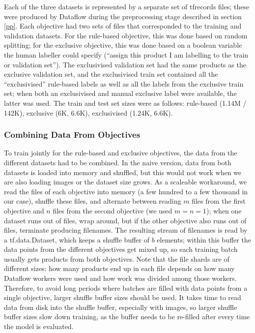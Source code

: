 Each of the three datasets is represented by a separate set of tfrecords files; these were produced by Dataflow during the preprocessing stage described in section \ref{pp}.
Each objective had two sets of files that corresponded to the training and validation datasets.
For the rule-based objective, this was done based on random splitting; for the exclusive objective, this was done based on a boolean variable the human labeller could specify (``assign this product I am labelling to the train or validation set'').
The exclusivised validation set had the same products as the exclusive validation set, and the exclusivised train set contained all the ``exclusivised'' rule-based labels as well as all the labels from the exclusive train set; when both an exclusivised and manual exclusive label were available, the latter was used.
The train and test set sizes were as follows: rule-based (1.14M / 142K), exclusive (6K, 6.6K), exclusivised (1.24K, 6.6K).

\subsubsection{Combining Data From Objectives}

To train jointly for the rule-based and exclusive objectives, the data from the different datasets had to be combined.
In the naive version, data from both datasets is loaded into memory and shuffled, but this would not work when we are also loading images or the dataset size grows.
As a scaleable workaround, we read the files of each objective into memory (a few hundred to a few thousand in our case), shuffle these files, and alternate between reading $m$ files from the first objective and $n$ files from the second objective (we used $m = n = 1$); when one dataset runs out of files, wrap around, but if the other objective also runs out of files, terminate producing filenames.
The resulting stream of filenames is read by a tf.data.Dataset, which keeps a shuffle buffer of $b$ elements; within this buffer the data points from the different objectives get mixed up, so each training batch usually gets products from both objectives.
Note that the file shards are of different sizes: how many products end up in each file depends on how many Dataflow workers were used and how work was divided among those workers.
Therefore, to avoid long periods where batches are filled with data points from a single objective, larger shuffle buffer sizes should be used.
It takes time to read data from disk into the shuffle buffer, especially with images, so larger shuffle buffer sizes slow down training, as the buffer needs to be re-filled after every time the model is evaluated.

